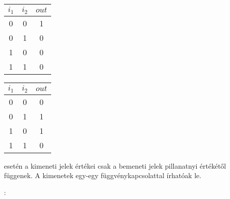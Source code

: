 \documentclass[main.tex]{subfiles}
\begin{document}
  \begin{minipage}[t]{0.166\textwidth}
    \begin{center}
      \begin{tabular}{|c|c|c|}
        \hline
        $i_1$ & $i_2$ & $out$
        \\ \hline \hline
        0 & 0 & 1
        \\ \hline
        0 & 1 & 0
        \\ \hline
        1 & 0 & 0
        \\ \hline
        1 & 1 & 0
        \\ \hline
      \end{tabular}
    \end{center}
  \end{minipage}\hfill
  \begin{minipage}[t]{0.166\textwidth}
    \begin{center}
      \begin{tabular}{|c|c|c|}
        \hline
        $i_1$ & $i_2$ & $out$
        \\ \hline \hline
        0 & 0 & 0
        \\ \hline
        0 & 1 & 1
        \\ \hline
        1 & 0 & 1
        \\ \hline
        1 & 1 & 0
        \\ \hline
      \end{tabular}
    \end{center}
  \end{minipage}\hfill
  
   esetén a
  kimeneti jelek értékei csak a bemeneti jelek
  pillanatnyi értékétől függenek. A kimenetek
  egy-egy függvénykapcsolattal írhatóak le.
 
  \vspace{1em}
  {\large {}:}
\end{document}
